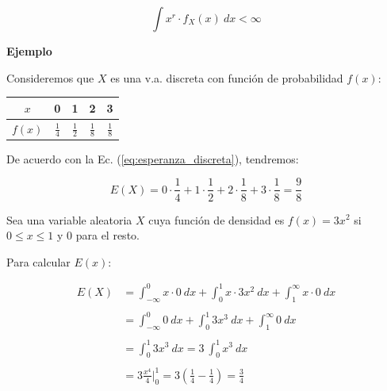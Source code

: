 \begin{equation}
  \int x^r \cdot f_{X}(x) \ dx < \infty
\end{equation}

\textbf{Ejemplo}

Consideremos que $X$ es una v.a. discreta con función de probabilidad $f(x)$:

\begin{center}
\begin{tabular}{c|cccc}
  $x$     & 0 & 1 & 2 & 3 \\
  \hline
  $f(x)$  & $\frac{1}{4}$ & $\frac{1}{2}$ & $\frac{1}{8}$ & $\frac{1}{8}$
\end{tabular}
\end{center}
  
De acuerdo con la Ec. (\ref{eq:esperanza_discreta}), tendremos:

\begin{equation}
  E(X) = 0 \cdot \frac{1}{4} + 1 \cdot \frac{1}{2} + 2 \cdot \frac{1}{8} + 3 \cdot \frac{1}{8} = \frac{9}{8}
\end{equation}
  
Sea una variable aleatoria $X$ cuya función de densidad es $f(x)=3x^2$ si $0
\leq x \leq 1$ y $0$ para el resto.

Para calcular $E(x)$:

\begin{equation}
  \begin{array}{rl}
    E(X)  & = \int_{- \infty}^{0} x \cdot 0 \ dx + \int_{0}^{1} x \cdot 3x^2 \ dx + \int_{1}^{\infty} x \cdot 0 \ dx \\
    \\
          & = \int_{- \infty}^{0} 0 \ dx + \int_{0}^{1} 3x^3 \ dx + \int_{1}^{\infty} 0 \ dx \\
    \\
          & = \int_{0}^{1} 3x^3 \ dx = 3 \ \int_{0}^{1} x^3 \ dx \\
    \\
          & = 3 \frac{x^4}{4} |_{0}^{1} = 3(\frac{1}{4} - \frac{1}{4}) = \frac{3}{4}
  \end{array}
\end{equation}
  
